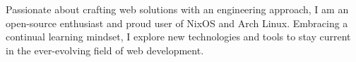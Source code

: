 

\begin{cvparagraph}

Passionate about crafting web solutions with an engineering approach, I am an open-source enthusiast and proud user of NixOS and Arch Linux. Embracing a continual learning mindset, I explore new technologies and tools to stay current in the ever-evolving field of web development.
\end{cvparagraph}
